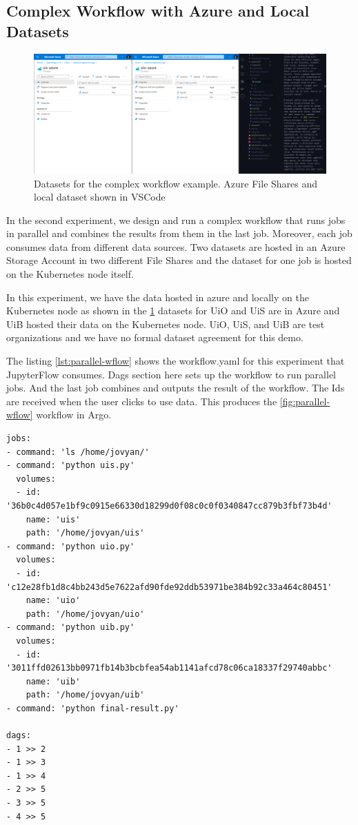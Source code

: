 \subsection{Complex Workflow with Azure and Local Datasets}

\begin{figure}
    \centering
    \includegraphics[width=14cm,keepaspectratio]{photos/dataset.png}
    \caption{Datasets for the complex workflow example. Azure File Shares and local dataset shown in VSCode}
    \label{fig:datasets}
\end{figure}

In the second experiment, we design and run a complex workflow that runs jobs in parallel and combines the results from them in the last job. Moreover, each job consumes data from different data sources. Two datasets are hosted in an Azure Storage Account in two different File Shares and the dataset for one job is hosted on the Kubernetes node itself.

\bigskip
In this experiment, we have the data hosted in azure and locally on the Kubernetes node as shown in the \ref{fig:datasets} datasets for UiO and UiS are in Azure and UiB hosted their data on the Kubernetes node. UiO, UiS, and UiB are test organizations and we have no formal dataset agreement for this demo.

\bigskip
The listing \ref{lst:parallel-wflow} shows the workflow.yaml for this experiment that JupyterFlow consumes. Dags section here sets up the workflow to run parallel jobs. And the last job combines and outputs the result of the workflow. The Ids are received when the user clicks to use data. This produces the \ref{fig:parallel-wflow} workflow in Argo.

\begin{lstlisting}[caption={Complex workflow consuming data from Azure},label={lst:parallel-wflow}]
jobs:
- command: 'ls /home/jovyan/'
- command: 'python uis.py'
  volumes:
  - id: '36b0c4d057e1bf9c0915e66330d18299d0f08c0c0f0340847cc879b3fbf73b4d'
    name: 'uis'
    path: '/home/jovyan/uis'
- command: 'python uio.py'
  volumes:
  - id: 'c12e28fb1d8c4bb243d5e7622afd90fde92ddb53971be384b92c33a464c80451'
    name: 'uio'
    path: '/home/jovyan/uio'
- command: 'python uib.py'
  volumes:
  - id: '3011ffd02613bb0971fb14b3bcbfea54ab1141afcd78c06ca18337f29740abbc'
    name: 'uib'
    path: '/home/jovyan/uib'
- command: 'python final-result.py'

dags:
- 1 >> 2
- 1 >> 3
- 1 >> 4
- 2 >> 5
- 3 >> 5
- 4 >> 5
\end{lstlisting}


